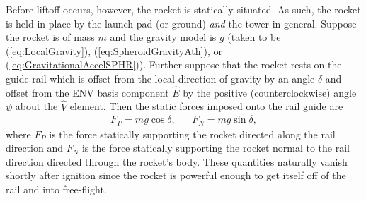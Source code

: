 \documentclass[11pt,dvipsnames]{thesis}
\begin{document}
Before liftoff occurs, however, the rocket is statically situated. As such, the rocket is held in place by the launch pad (or ground) \textit{and} the tower in general. Suppose the rocket is of mass $m$ and the gravity model is $g$ (taken to be (\ref{eq:LocalGravity}), (\ref{eq:SpheroidGravityAth}), or (\ref{eq:GravitationalAccelSPHR})). 
Further suppose that the rocket rests on the guide rail which is offset from the local direction of gravity by an angle $\delta$ and offset from the ENV basis component $\widehat{E}$ by the positive (counterclockwise) angle $\psi$ about the $\widehat{V}$ element. 
Then the static forces imposed onto the rail guide are
\begin{align}
F_P = mg\cos\delta, && F_N = mg\sin\delta, \label{eq:PrelaunchStaticForces}
\end{align}
where $F_P$ is the force statically supporting the rocket directed along the rail direction and $F_N$ is the force statically supporting the rocket normal to the rail direction directed through the rocket's body.
These quantities naturally vanish shortly after ignition since the rocket is powerful enough to get itself off of the rail and into free-flight.
\end{document}
